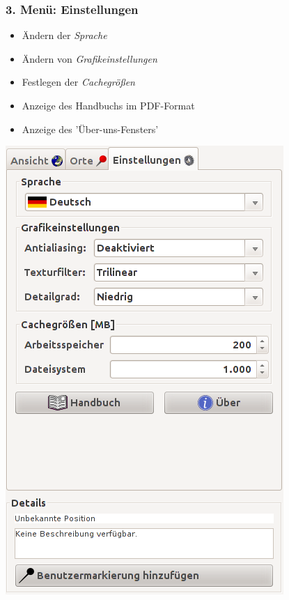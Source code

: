 \documentclass[10pt]{scrreprt}
\newcommand{\textref}[1]{\mbox{\raisebox{0.1ex}{\small$\rightarrow$ }\textit{#1}}}
\begin{document}
\newpage
\begin{minipage}[t]{9cm}
\vspace{-40mm}
\subsubsection{3. Menü: Einstellungen} 
	\begin{itemize}
	\item Ändern der \textref{Sprache}  
	\item Ändern von \textref{Grafikeinstellungen} 
	\item Festlegen der \textref{Cachegrößen} 
	\item Anzeige des Handbuchs im PDF-Format
	\item Anzeige des 'Über-uns-Fensters'
	\end{itemize}
\end{minipage}
\begin{minipage}{7cm}
\centering
\includegraphics[scale=0.35]{images/einstellungen_tab_DE.png}
\end{minipage}
\end{document}
